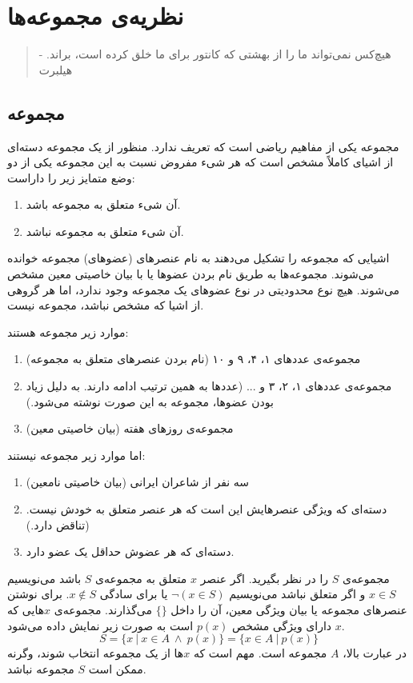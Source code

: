 \chapter{نظریه‌ی مجموعه‌ها}
\thispagestyle{empty}

\begin{quote}
	{\lotus
		هیچ‌کس نمی‌تواند ما را از بهشتی که کانتور برای ما خلق کرده است، براند. \quad - هیلبرت%
	}
\end{quote}

\section{مجموعه}
مجموعه یکی از مفاهیم ریاضی است که تعریف ندارد. منظور از یک مجموعه دسته‌ای از اشیای کاملاً مشخص است که هر شیء مفروض نسبت به این مجموعه یکی از دو وضع متمایز زیر را داراست:
\begin{enumerate}
	\item 
	آن شیء متعلق به مجموعه باشد.
	\item 
	آن شیء متعلق به مجموعه نباشد.
\end{enumerate}
اشیایی که مجموعه را تشکیل می‌دهند به نام عنصرهای (عضوهای) مجموعه خوانده می‌شوند. مجموعه‌ها به طریق نام بردن عضوها یا با بیان خاصیتی معین مشخص می‌شوند. هیچ نوع محدودیتی در نوع عضوهای یک مجموعه وجود ندارد، اما هر گروهی از اشیا که مشخص نباشد، مجموعه نیست.
\begin{example}
	موارد زیر مجموعه هستند:
	\begin{enumerate}
		\item 
		مجموعه‌ی عددهای ۱، ۴، ۹ و ۱۰ (نام بردن عنصرهای متعلق به مجموعه)
		\item 
		مجموعه‌ی عددهای ۱، ۲، ۳ و ... (عددها به همین ترتیب ادامه دارند. به دلیل زیاد بودن عضوها، مجموعه به این صورت نوشته می‌شود.)
		\item 
		مجموعه‌ی روزهای هفته (بیان خاصیتی معین)
	\end{enumerate}
	اما موارد زیر مجموعه نیستند:
	\begin{enumerate}
		\item 
		سه نفر از شاعران ایرانی (بیان خاصیتی نامعین)
		\item 
		دسته‌ای که ویژگی عنصرهایش این است که هر عنصر متعلق به خودش نیست. (تناقض دارد.)
		\item 
		دسته‌ای که هر عضوش حداقل یک عضو دارد.
	\end{enumerate}
\end{example}
\smallskip
مجموعه‌ی $S$ را در نظر بگیرید. اگر عنصر $x$ متعلق به مجموعه‌ی $S$ باشد می‌نویسیم
$x \in S$
و اگر متعلق نباشد می‌نویسیم
$\neg(x \in S)$ یا برای سادگی $x \notin S$.
برای نوشتن عنصرهای مجموعه یا بیان ویژگی معین، آن را داخل $\{\}$ می‌گذارند. مجموعه‌ی $x$هایی که $x$ دارای ویژگی مشخص $p(x)$ است به صورت زیر نمایش داده می‌شود.
$$S=\{x \ | \ x \in A \ \wedge \ p(x)\} = \{x \in A \ | \ p(x)\}$$
در عبارت بالا، $‌‌A$ مجموعه است. مهم است که $x$ها از یک مجموعه انتخاب شوند، وگرنه ممکن است $S$ مجموعه نباشد.

